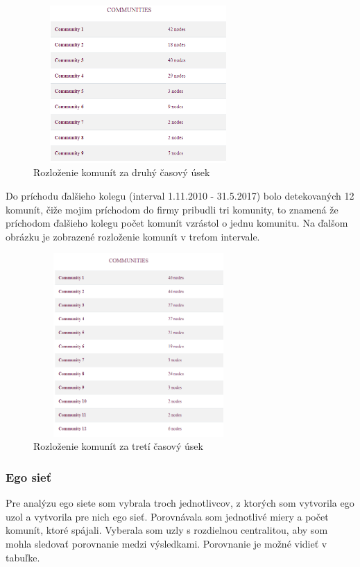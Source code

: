 \documentclass[slovak,master,public,dept460,male,cpdeclaration,oneside]{diploma}
\begin{document}
\begin{figure}[H]
\centering
\includegraphics[width=8cm, height=6cm]{figures/team_communities_tab_second}
\caption{Rozloženie komunít za druhý časový úsek}
\label{team_communities_second}
\end{figure}

Do príchodu ďalšieho kolegu (interval 1.11.2010 - 31.5.2017) bolo detekovaných 12 komunít, čiže mojim príchodom do firmy pribudli tri komunity, to znamená že príchodom ďalšieho kolegu počet komunít vzrástol o jednu komunitu. Na ďalšom obrázku je zobrazené rozloženie komunít v treťom intervale.

\begin{figure}[H]
\centering
\includegraphics[width=8cm, height=7cm]{figures/team_communities_tab_third}
\caption{Rozloženie komunít za tretí časový úsek}
\label{team_communities_third}
\end{figure}



\subsubsection{Ego sieť}
Pre analýzu ego siete som vybrala troch jednotlivcov, z ktorých som vytvorila ego uzol a vytvorila pre nich ego sieť. Porovnávala som jednotlivé miery a počet komunít, ktoré spájali. Vyberala som uzly s rozdielnou centralitou, aby som mohla sledovať porovnanie medzi výsledkami. Porovnanie je možné vidieť v tabuľke.
\end{document}
